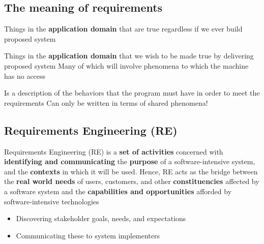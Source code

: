 \documentclass{article}
\begin{document}
\subsection{The meaning of requirements}
\vspace{-8pt}
\begin{description}
  \setlength\itemsep{-.25em}
  \item [Domain Properties] Things in the \textbf{application domain} that are true regardless if we ever build  proposed system
  \item [Requirements] Things in the \textbf{application domain} that we wish to be made true by delivering proposed system\newline
Many of which will involve phenomena to which the machine has no
access
  \item [A Specification] Is a description of the behaviors that the program must have in order to meet the requirements\newline 
Can only be written in terms of shared phenomena!
\end{description}

\subsection{Requirements Engineering (RE)}
\vspace{-6pt}
Requirements Engineering (RE) is a \textbf{set of activities} concerned with \textbf{identifying and communicating} the \textbf{purpose} of a software-intensive system, and the \textbf{contexts} in which it will be used. Hence, RE acts as the bridge between the \textbf{real world needs} of users, customers, and other \textbf{constituencies} affected by a software system and the \textbf{capabilities and opportunities} afforded by software-intensive technologies
\begin{itemize}
  \setlength\itemsep{-.25em}
  \item Discovering stakeholder goals, needs, and expectations
  \item Communicating these to system implementers
\end{itemize}
\end{document}
